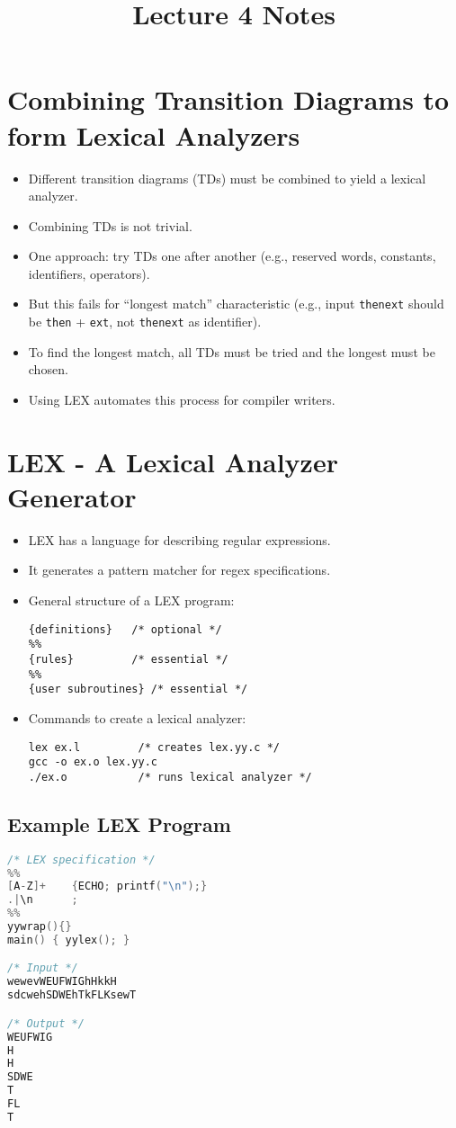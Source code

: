 \documentclass[12pt,a4paper]{article}
\title{Lecture 4 Notes}
\author{}
\date{}
\begin{document}
\maketitle

\section*{Combining Transition Diagrams to form Lexical Analyzers}
\begin{itemize}
    \item Different transition diagrams (TDs) must be combined to yield a lexical analyzer.
    \item Combining TDs is not trivial.
    \item One approach: try TDs one after another (e.g., reserved words, constants, identifiers, operators).
    \item But this fails for ``longest match'' characteristic (e.g., input \texttt{thenext} should be \texttt{then} + \texttt{ext}, not \texttt{thenext} as identifier).
    \item To find the longest match, all TDs must be tried and the longest must be chosen.
    \item Using LEX automates this process for compiler writers.
\end{itemize}

\section*{LEX - A Lexical Analyzer Generator}
\begin{itemize}
    \item LEX has a language for describing regular expressions.
    \item It generates a pattern matcher for regex specifications.
    \item General structure of a LEX program:
\begin{verbatim}
{definitions}   /* optional */
%%
{rules}         /* essential */
%%
{user subroutines} /* essential */
\end{verbatim}
    \item Commands to create a lexical analyzer:
\begin{verbatim}
lex ex.l         /* creates lex.yy.c */
gcc -o ex.o lex.yy.c
./ex.o           /* runs lexical analyzer */
\end{verbatim}
\end{itemize}

\subsection*{Example LEX Program}
\begin{lstlisting}[language=C]
/* LEX specification */
%%
[A-Z]+    {ECHO; printf("\n");}
.|\n      ;
%%
yywrap(){}
main() { yylex(); }

/* Input */
wewevWEUFWIGhHkkH
sdcwehSDWEhTkFLKsewT

/* Output */
WEUFWIG
H
H
SDWE
T
FL
T
\end{lstlisting}
\end{document}
